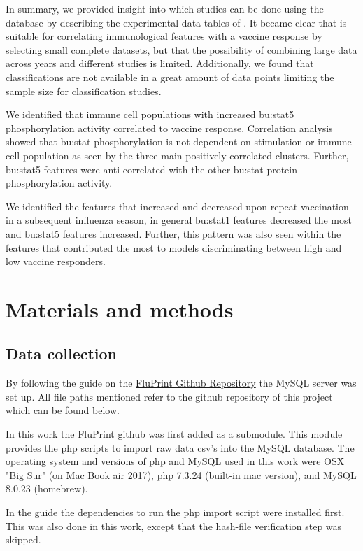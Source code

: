 In summary, we provided insight into which studies can be done using the \flup database by describing the experimental data tables of \flup.
It became clear that \flup is suitable for correlating immunological features with a vaccine response by selecting small complete datasets, but that the possibility of combining large data across years and different studies is limited.
Additionally, we found that classifications are not available in a great amount of data points limiting the sample size for classification studies.

We identified that immune cell populations with increased \gls{bu:stat}5 phosphorylation activity correlated to vaccine response.
Correlation analysis showed that \gls{bu:stat} phosphorylation is not dependent on stimulation or immune cell population as seen by the three main positively correlated clusters.
Further, \gls{bu:stat}5 features were anti-correlated with the other \gls{bu:stat} protein phosphorylation activity.

We identified the features that increased and decreased upon repeat vaccination in a subsequent influenza season, in general \gls{bu:stat}1 features decreased the most and \gls{bu:stat}5 features increased.
Further, this pattern was also seen within the features that contributed the most to models discriminating between high and low vaccine responders.


\section{Materials and methods}

\subsection{Data collection}

By following the guide on the \href{https://github.com/LogIN-/fluprint}{FluPrint Github Repository} the MySQL
server was set up.
All file paths mentioned refer to the github repository of this project which can be found below.

In this work the FluPrint github was first added as a submodule.
This module provides the php scripts to import raw data csv's into the MySQL database.
The operating system and versions of php and MySQL used in this work were OSX "Big Sur" (on Mac Book air 2017), php 7.3.24 (built-in mac version), and MySQL 8.0.23 (homebrew).

In the \href{https://github.com/LogIN-/fluprint}{guide} the dependencies to run
the php import script were installed first. This was also done in this work,
except that the hash-file verification step was skipped.

